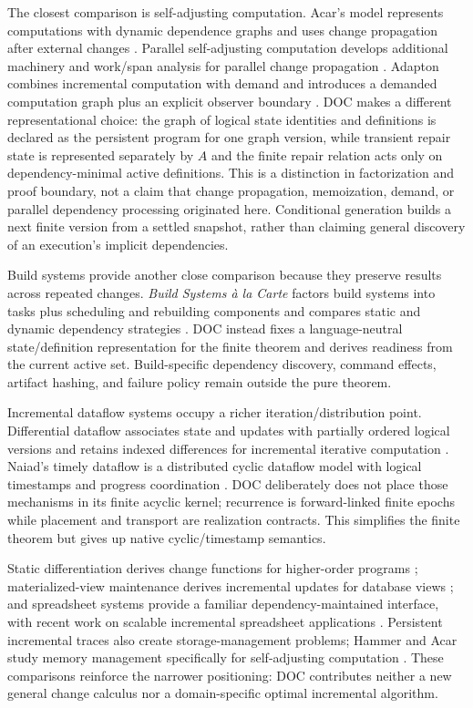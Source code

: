 The closest comparison is self-adjusting computation. Acar's model represents computations with dynamic dependence graphs and uses change propagation after external changes \cite{acar2005}. Parallel self-adjusting computation develops additional machinery and work/span analysis for parallel change propagation \cite{anderson2021}. Adapton combines incremental computation with demand and introduces a demanded computation graph plus an explicit observer boundary \cite{hammer2014adapton}. DOC makes a different representational choice: the graph of logical state identities and definitions is declared as the persistent program for one graph version, while transient repair state is represented separately by $A$ and the finite repair relation acts only on dependency-minimal active definitions. This is a distinction in factorization and proof boundary, not a claim that change propagation, memoization, demand, or parallel dependency processing originated here. Conditional generation builds a next finite version from a settled snapshot, rather than claiming general discovery of an execution's implicit dependencies.

Build systems provide another close comparison because they preserve results across repeated changes. \emph{Build Systems \`a la Carte} factors build systems into tasks plus scheduling and rebuilding components and compares static and dynamic dependency strategies \cite{mokhov2018}. DOC instead fixes a language-neutral state/definition representation for the finite theorem and derives readiness from the current active set. Build-specific dependency discovery, command effects, artifact hashing, and failure policy remain outside the pure theorem.

Incremental dataflow systems occupy a richer iteration/distribution point. Differential dataflow associates state and updates with partially ordered logical versions and retains indexed differences for incremental iterative computation \cite{mcsherry2013}. Naiad's timely dataflow is a distributed cyclic dataflow model with logical timestamps and progress coordination \cite{murray2013}. DOC deliberately does not place those mechanisms in its finite acyclic kernel; recurrence is forward-linked finite epochs while placement and transport are realization contracts. This simplifies the finite theorem but gives up native cyclic/timestamp semantics.


Static differentiation derives change functions for higher-order programs \cite{cai2014}; materialized-view maintenance derives incremental updates for database views \cite{blakeley1986}; and spreadsheet systems provide a familiar dependency-maintained interface, with recent work on scalable incremental spreadsheet applications \cite{hadar2023}. Persistent incremental traces also create storage-management problems; Hammer and Acar study memory management specifically for self-adjusting computation \cite{hammer2008memory}. These comparisons reinforce the narrower positioning: DOC contributes neither a new general change calculus nor a domain-specific optimal incremental algorithm.

